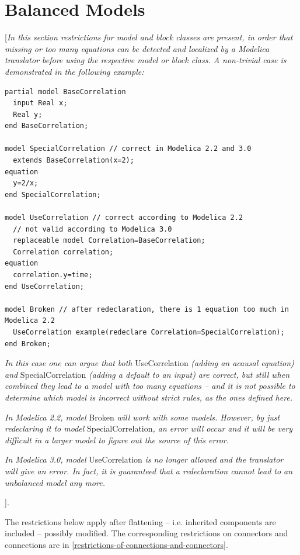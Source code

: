 \documentclass[10pt,a4paper]{report}
\def\doublelabel#1{\label{#1}\hypertarget{#1}{}}
\begin{document}
\section{Balanced Models}\doublelabel{balanced-models}

{[}\emph{In this section restrictions for model and block classes are
present, in order that missing or too many equations can be detected and
localized by a Modelica translator before using the respective model or
block class. A non-trivial case is demonstrated in the following
example:}

\begin{lstlisting}[language=modelica]
partial model BaseCorrelation
  input Real x;
  Real y;
end BaseCorrelation;

model SpecialCorrelation // correct in Modelica 2.2 and 3.0
  extends BaseCorrelation(x=2);
equation
  y=2/x;
end SpecialCorrelation;

model UseCorrelation // correct according to Modelica 2.2
  // not valid according to Modelica 3.0
  replaceable model Correlation=BaseCorrelation;
  Correlation correlation;
equation
  correlation.y=time;
end UseCorrelation;

model Broken // after redeclaration, there is 1 equation too much in Modelica 2.2
  UseCorrelation example(redeclare Correlation=SpecialCorrelation);
end Broken;
\end{lstlisting}

\emph{In this case one can argue that both} UseCorrelation \emph{(adding
an acausal equation) and} SpecialCorrelation \emph{(adding a default to
an input) are correct, but still when combined they lead to a model with
too many equations -- and it is not possible to determine which model is
incorrect without strict rules, as the ones defined here.}

\emph{In Modelica 2.2, model} Broken \emph{will work with some models.
However, by just redeclaring it to model} SpecialCorrelation\emph{, an
error will occur and it will be very difficult in a larger model to
figure out the source of this error. }

\emph{In Modelica 3.0, model} UseCorrelation \emph{is no longer allowed
and the translator will give an error. In fact, it is guaranteed that a
redeclaration cannot lead to an unbalanced model any more.}

{]}.

The restrictions below apply after flattening -- i.e. inherited
components are included -- possibly modified. The corresponding
restrictions on connectors and connections are in \ref{restrictions-of-connections-and-connectors}.
\end{document}
